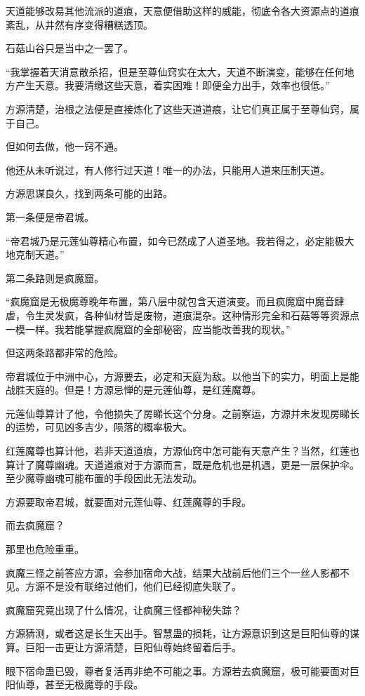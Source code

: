 \begin{this_body}
天道能够改易其他流派的道痕，天意便借助这样的威能，彻底令各大资源点的道痕紊乱，从井然有序变得糟糕透顶。

石菇山谷只是当中之一罢了。

“我掌握着天消意散杀招，但是至尊仙窍实在太大，天道不断演变，能够在任何地方产生天意。我要清缴这些天意，着实困难！即便全力出手，效率也很低。”

方源清楚，治根之法便是直接炼化了这些天道道痕，让它们真正属于至尊仙窍，属于自己。

但如何去做，他一窍不通。

他还从未听说过，有人修行过天道！唯一的办法，只能用人道来压制天道。

方源思谋良久，找到两条可能的出路。

第一条便是帝君城。

“帝君城乃是元莲仙尊精心布置，如今已然成了人道圣地。我若得之，必定能极大地克制天道。”

第二条路则是疯魔窟。

“疯魔窟是无极魔尊晚年布置，第八层中就包含天道演变。而且疯魔窟中魔音肆虐，令生灵发疯，各种仙材皆是废物，道痕混杂。这种情形完全和石菇等等资源点一模一样。我若能掌握疯魔窟的全部秘密，应当能改善我的现状。”

但这两条路都非常的危险。

帝君城位于中洲中心，方源要去，必定和天庭为敌。以他当下的实力，明面上是能战胜天庭的。但是！方源忌惮的是元莲仙尊，是红莲魔尊。

元莲仙尊算计了他，令他损失了房睇长这个分身。之前察运，方源并未发现房睇长的运势，可见凶多吉少，陨落的概率极大。

红莲魔尊也算计他，若非天道道痕，方源仙窍中怎可能有天意产生？当然，红莲也算计了魔尊幽魂。天道道痕对于方源而言，既是危机也是机遇，更是一层保护伞。至少魔尊幽魂可能布置的手段因此无法发动。

方源要取帝君城，就要面对元莲仙尊、红莲魔尊的手段。

而去疯魔窟？

那里也危险重重。

疯魔三怪之前答应方源，会参加宿命大战，结果大战前后他们三个一丝人影都不见。方源不是没有联络过他们，他们已经彻底失联了。

疯魔窟究竟出现了什么情况，让疯魔三怪都神秘失踪？

方源猜测，或者这是长生天出手。智慧蛊的损耗，让方源意识到这是巨阳仙尊的谋算。巨阳一击更让方源清楚，巨阳仙尊始终留着后手。

眼下宿命蛊已毁，尊者复活再非绝不可能之事。方源若去疯魔窟，极可能要面对巨阳仙尊，甚至无极魔尊的手段。


\end{this_body}
